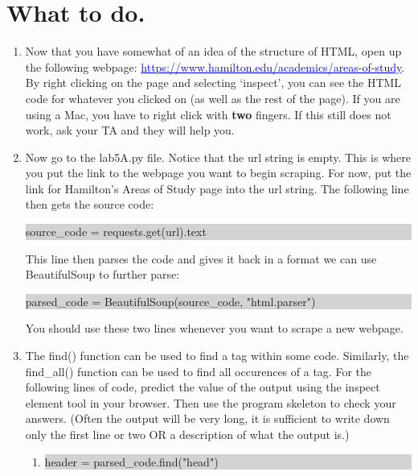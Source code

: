 \documentclass[11pt, letterpaper, onecolumn, oneside, final]{article}
\begin{document}
\section{What to do.}
\begin{enumerate}    
    \item Now that you have somewhat of an idea of the structure of HTML, open up the following webpage: 
    \textcolor{blue}{\underline{https://www.hamilton.edu/academics/areas-of-study}}. By right clicking on the page and selecting `inspect', you can see the HTML code for whatever you clicked on (as well as the rest of the page). If you are using a Mac, you have to right click with \textbf{two} fingers. If this still does not work, ask your TA and they will help you. 
    
    \item Now go to the {\consolas lab5A.py} file. Notice that the {\consolas url} string is empty. This is where you put the link to the webpage you want to begin scraping. For now, put the link for Hamilton's Areas of Study page into the url string. The following line then gets the source code:
    \begin{center}
        \colorbox{lightgray}{\parbox{.48\textwidth}{\consolas source\_code =  requests.get(url).text}}
    \end{center}
    This line then parses the code and gives it back in a format we can use BeautifulSoup to further parse:
    \begin{center}
        \colorbox{lightgray}{\parbox{.7\textwidth}{\consolas parsed\_code = BeautifulSoup(source\_code, "html.parser")}}
    \end{center}
    You should use these two lines whenever you want to scrape a new webpage. 
    
    \item The {\consolas find()} function can be used to find a tag within some code. Similarly, the {\consolas find\_all()} function can be used to find all occurences of a tag. For the following lines of code, predict the value of the output using the inspect element tool in your browser. Then use the program skeleton to check your answers. (Often the output will be very long, it is sufficient to write down only the first line or two OR a description of what the output is.)
    \begin{enumerate}
        \item \colorbox{lightgray}{\parbox{.43\textwidth}{\consolas header = parsed\_code.find("head")}}\\\\
        

\end{enumerate}
\end{enumerate}
\end{document}
